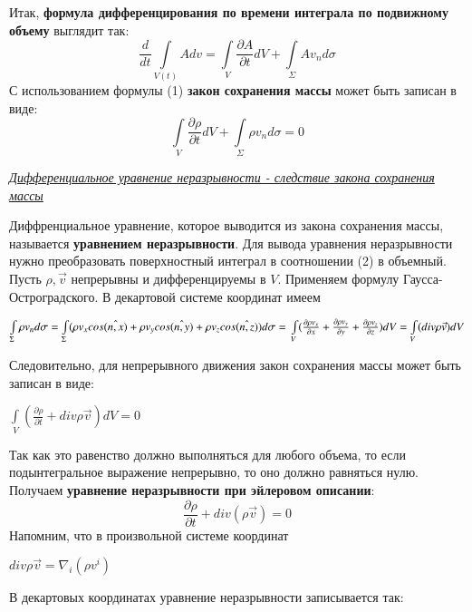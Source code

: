 Итак, \textbf{формула дифференцирования по времени интеграла по подвижному объему} выглядит так:
\begin{equation}
    \frac{d}{dt}\int\limits_{V(t)}A dv= \int\limits_V \frac{\partial A}{\partial t} dV + \int\limits_{\Sigma}A v_n d\sigma
\end{equation}
С использованием формулы (1) \textbf{закон сохранения массы} может быть записан в виде:
\begin{equation}
    \int\limits_V \frac{\partial \rho}{\partial t} dV + \int\limits_{\Sigma}\rho v_n d \sigma = 0
\end{equation}

\begin{center}
    \textit{\underline{Дифференциальное уравнение неразрывности - следствие закона сохранения массы}}
\end{center}
Диффренциальное уравнение, которое выводится из закона сохранения массы, называется \textbf{уравнением неразрывности}. Для вывода уравнения неразрывности нужно преобразовать поверхностный интеграл в соотношении (2) в объемный. Пусть $\rho, \Vec{v}$ непрерывны и дифференцируемы в $V$. Применяем формулу Гаусса-Остроградского. В декартовой системе координат имеем
\begin{center}$
\int\limits_{\Sigma} \rho v_n d \sigma
= \int\limits_{\Sigma} (\rho v_x cos \hat{(n,x)} + \rho v_y cos \hat{(n,y)} + \rho v_z cos \hat{(n,z)})d \sigma
=\newline
\int\limits_V ( \frac{\partial \rho v_x}{\partial x} + \frac{\partial \rho v_y}{\partial y} + \frac{\partial \rho v_z}{\partial z})dV
=
\int\limits_V (div \rho \Vec{v})dV
$\end{center}
Следовительно, для непрерывного движения закон сохранения массы может быть записан в виде:
\begin{center}$
\int\limits_V (\frac{\partial \rho}{\partial t} + div \rho \Vec{v})dV = 0
$\end{center}
Так как это равенство должно выполняться для любого объема, то если подынтегральное выражение непрерывно, то оно должно равняться нулю. Получаем
\textbf{уравнение неразрывности при эйлеровом описании}:
\begin{equation}
    \frac{\partial \rho}{\partial t} + div (\rho \Vec{v}) = 0
\end{equation}
Напомним, что в произвольной системе координат
\begin{center}$
div \rho \Vec{v} = \nabla_i(\rho v^i)
$\end{center}
В декартовых координатах уравнение неразрывности записывается так:
